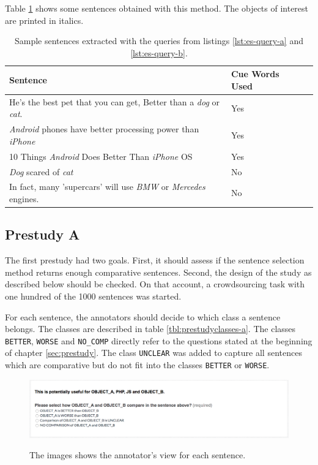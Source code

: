 Table \ref{tbl:example_sentences} shows some sentences obtained with this method. The objects of interest are printed in italics.

\begin{table}[h]
\centering
\caption{Sample sentences extracted with the queries from listings \ref{lst:es-query-a} and \ref{lst:es-query-b}.}
\label{tbl:example_sentences}
\begin{tabular}{@{}llr@{}}
\toprule
 Sentence   &  Cue Words Used                      \\ \midrule
 He's the best pet that you can get, Better than a \emph{dog} or \emph{cat}. & Yes \\
\emph{Android} phones have better processing power than \emph{iPhone} & Yes \\
 10 Things \emph{Android} Does Better Than \emph{iPhone} OS & Yes \\
 \emph{Dog} scared of \emph{cat} & No \\
 In fact, many 'supercars' will use \emph{BMW} or \emph{Mercedes} engines. & No \\

\bottomrule  
                               
\end{tabular}
\end{table}



\subsection{Prestudy A}
The first prestudy had two goals. First, it should assess if the sentence selection method returns enough comparative sentences. Second, the design of the study as described below should be checked. On that account, a crowdsourcing task with one hundred of the 1000 sentences was started. 



For each sentence, the annotators should decide to which class a sentence belongs. The classes are described in table \ref{tbl:prestudyclasses-a}. The classes \texttt{BETTER}, \texttt{WORSE} and \texttt{NO\_COMP} directly refer to the questions stated at the beginning of chapter \ref{sec:prestudy}. The class \texttt{UNCLEAR} was added to capture all sentences which are comparative but do not fit into the classes \texttt{BETTER} or \texttt{WORSE}.

\begin{figure}[h]
\centering
\includegraphics[width=1\textwidth]{images/prestudy/1_question}
\label{img:1question}
\caption{The images shows the annotator's view for each sentence.}
\end{figure}

